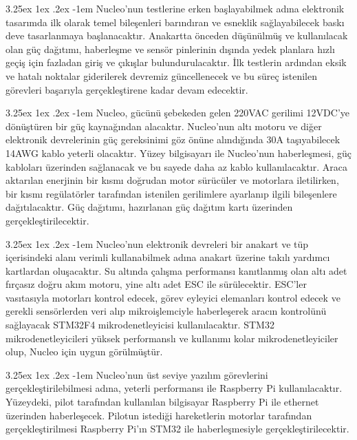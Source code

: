\documentclass[12pt]{article}
\makeatletter
\newcounter{subsubsubsection}[subsubsection]
\renewcommand\paragraph{\@startsection{paragraph}{5}{\z@}%
  {3.25ex \@plus1ex \@minus.2ex}%
  {-1em}%
  {\normalfont\normalsize\bfseries}}
\makeatother
\begin{document}
\paragraph{} Nucleo'nun testlerine erken başlayabilmek adına elektronik tasarımda ilk olarak temel bileşenleri barındıran ve esneklik sağlayabilecek baskı deve tasarlanmaya başlanacaktır. Anakartta önceden düşünülmüş ve kullanılacak olan güç dağıtımı, haberleşme ve sensör pinlerinin dışında yedek planlara hızlı geçiş için fazladan giriş ve çıkışlar bulundurulacaktır. İlk testlerin ardından eksik ve hatalı noktalar giderilerek devremiz güncellenecek ve bu süreç istenilen görevleri başarıyla gerçekleştirene kadar devam edecektir. 


\paragraph{} Nucleo, gücünü şebekeden gelen 220VAC gerilimi 12VDC'ye dönüştüren bir güç kaynağından alacaktır. Nucleo'nun altı motoru ve diğer elektronik devrelerinin güç gereksinimi göz önüne alındığında 30A taşıyabilecek 14AWG kablo yeterli olacaktır. Yüzey bilgisayarı ile Nucleo'nun haberleşmesi, güç kabloları üzerinden sağlanacak ve bu sayede daha az kablo kullanılacaktır. Araca aktarılan enerjinin bir kısmı doğrudan motor sürücüler ve motorlara iletilirken, bir kısmı regülatörler tarafından istenilen gerilimlere ayarlanıp ilgili bileşenlere dağıtılacaktır. Güç dağıtımı, hazırlanan güç dağıtım kartı üzerinden gerçekleştirilecektir.


\paragraph{} Nucleo'nun elektronik devreleri bir anakart ve tüp içerisindeki alanı verimli kullanabilmek adına anakart üzerine takılı yardımcı kartlardan oluşacaktır. Su altında çalışma performansı kanıtlanmış olan altı adet fırçasız doğru akım motoru, yine altı adet ESC ile sürülecektir. ESC'ler vasıtasıyla motorları kontrol edecek, görev eyleyici elemanları kontrol edecek ve gerekli sensörlerden veri alıp mikroişlemciyle haberleşerek aracın kontrolünü sağlayacak STM32F4 mikrodenetleyicisi kullanılacaktır. STM32 mikrodenetleyicileri yüksek performanslı ve kullanımı kolar mikrodenetleyiciler olup, Nucleo için uygun görülmüştür. 

\paragraph{} Nucleo'nun üst seviye yazılım görevlerini gerçekleştirilebilmesi adına, yeterli performansı ile Raspberry Pi kullanılacaktır. Yüzeydeki, pilot tarafından kullanılan bilgisayar Raspberry Pi ile ethernet üzerinden haberleşecek. Pilotun istediği hareketlerin motorlar tarafından gerçekleştirilmesi Raspberry Pi'ın STM32 ile haberleşmesiyle gerçekleştirilecektir.
\end{document}
